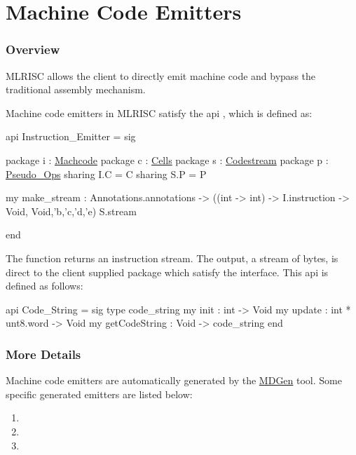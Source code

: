 \section{Machine Code Emitters}

\subsubsection{Overview}
MLRISC allows the client to directly emit machine code and bypass the traditional
assembly mechanism. 

Machine code emitters in MLRISC satisfy the api 
,
which is defined as:
\begin{SML}
api Instruction_Emitter =
sig

   package i : \href{instructions.html}{Machcode}
   package c : \href{cells.html}{Cells}
   package s : \href{streams.html}{Codestream}
   package p : \href{pseudo-ops.html}{Pseudo_Ops}
      sharing I.C = C  
      sharing S.P = P

   my make_stream : Annotations.annotations ->
                     ((int -> int) -> I.instruction -> Void,
                      Void,'b,'c,'d,'e) S.stream

end
\end{SML}

The function  returns an instruction stream.
The output, a stream of bytes, is direct to the client supplied
package which satisfy the 
 interface.
This api is defined as follows:
\begin{SML}
api Code_String = sig
  type code_string
  my init          : int -> Void
  my update        : int * unt8.word -> Void
  my getCodeString : Void -> code_string
end
\end{SML}

\subsubsection{More Details}

Machine code emitters are automatically generated by the 
\href{mlrisc-md.html}{MDGen} tool.  Some specific generated
emitters are listed below:
\begin{enumerate}
 \item {}
 \item {}
 \item {}
\end{enumerate}
